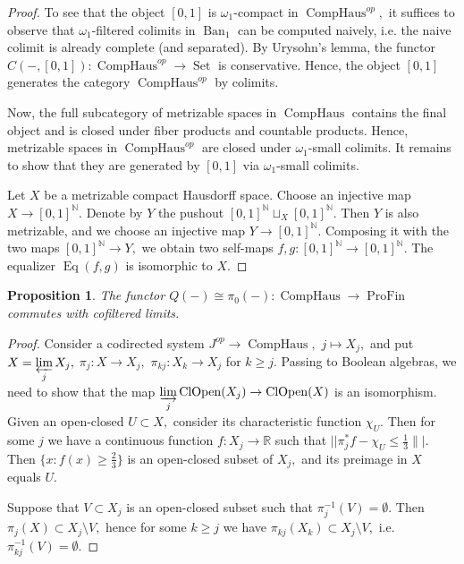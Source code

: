 \documentclass[11pt,leqno]{amsart}
\newtheorem{prop}[theo]{Proposition}
\numberwithin{equation}{section}
\def\N{\mathbb{N}}
\def\R{\mathbb{R}}
\newcommand{\indlim}[1][]{\mathop{\varinjlim}\limits_{#1}}
\newcommand{\prolim}[1][]{\mathop{\varprojlim}\limits_{#1}}
\newcommand{\profin}{\operatorname{ProFin}}
\newcommand{\comphaus}{\operatorname{CompHaus}}
\newcommand{\Ban}{\operatorname{Ban}}
\newcommand{\Eq}{\operatorname{Eq}}
\newcommand{\Set}{\operatorname{Set}}
\newcommand{\clopen}{\operatorname{ClOpen}}
\begin{document}
\begin{proof} To see that the object $[0,1]$ is $\omega_1$-compact in $\comphaus^{op},$ it suffices to observe that $\omega_1$-filtered colimits in $\Ban_1$ can be computed naively, i.e. the naive colimit is already complete (and separated). By Urysohn's lemma, the functor $C(-,[0,1]):\comphaus^{op}\to\Set$ is conservative. Hence, the object $[0,1]$ generates the category $\comphaus^{op}$ by colimits.

Now, the full subcategory of metrizable spaces in $\comphaus$ contains the final object and is closed under fiber products and countable products. Hence, metrizable spaces in $\comphaus^{op}$ are closed under $\omega_1$-small colimits. It remains to show that they are generated by $[0,1]$ via $\omega_1$-small colimits.


Let $X$ be a metrizable compact Hausdorff space. Choose an injective map $X\to[0,1]^{\N}.$ Denote by $Y$ the pushout $[0,1]^{\N}\sqcup_X [0,1]^{\N}.$ Then $Y$ is also metrizable,  
and we choose an injective map $Y\to [0,1]^{\N}.$ Composing it with the two maps $[0,1]^{\N}\to Y,$ we obtain two self-maps $f,g:[0,1]^{\N}\to [0,1]^{\N}.$ The equalizer $\Eq(f,g)$ is isomorphic to $X.$\end{proof}

\begin{prop}The functor $Q(-)\cong\pi_0(-):\comphaus\to\profin$ commutes with cofiltered limits.\end{prop}

\begin{proof}Consider a codirected system $J^{op}\to\comphaus,$ $j\mapsto X_j,$ and put $X=\prolim[j]X_j,$ $\pi_j:X\to X_j,$ $\pi_{kj}:X_k\to X_j$ for $k\geq j.$ Passing to Boolean algebras, we need to show that the map $\indlim[j]\clopen(X_j)\to\clopen(X)$ is an isomorphism. Given an open-closed $U\subset X,$ consider its characteristic function $\chi_U.$ Then for some $j$ we have a continuous function $f:X_j\to \R$ such that $||\pi_j^*f-\chi_U\leq \frac{1}{3}\||.$ Then $\{x: f(x)\geq \frac{2}{3}\}$ is an open-closed subset of $X_j,$ and its preimage in $X$ equals $U.$

Suppose that $V\subset X_j$ is an open-closed subset such that $\pi_j^{-1}(V)=\emptyset.$ Then $\pi_j(X)\subset X_j\setminus V,$ hence for some $k\geq j$ we have $\pi_{kj}(X_k)\subset X_j\setminus V,$ i.e. $\pi_{kj}^{-1}(V)=\emptyset.$\end{proof}
\end{document}

